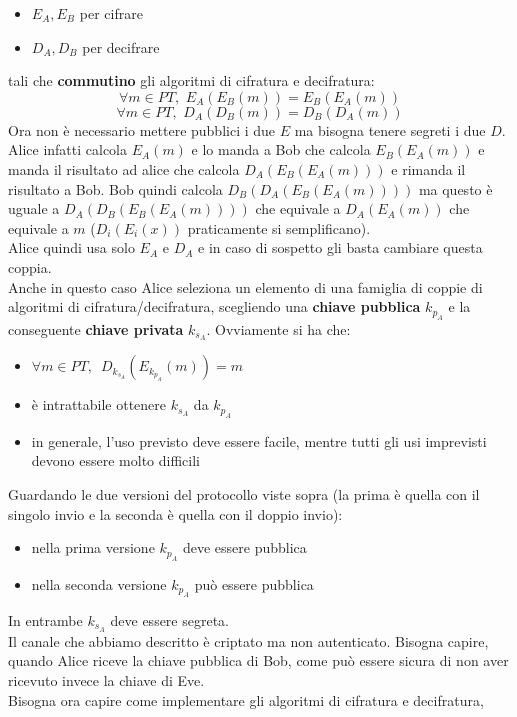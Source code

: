\documentclass[a4paper,12pt, oneside]{book}
\begin{document}
\begin{itemize}
  \item $E_A,E_B$ per cifrare
  \item $D_A,D_B$ per decifrare
\end{itemize}
tali che \textbf{commutino} gli algoritmi di cifratura e decifratura:
\[\forall m\in PT,\,\,E_A(E_B(m))=E_B(E_A(m))\]
\[\forall m\in PT,\,\,D_A(D_B(m))=D_B(D_A(m))\]
Ora non è necessario mettere pubblici i due $E$ ma bisogna tenere 
segreti i due $D$.\\
Alice infatti calcola $E_A(m)$ e lo manda a Bob che calcola $E_B(E_A(m))$ e
manda il risultato ad alice che calcola $D_A(E_B(E_A(m)))$ e rimanda il
risultato a Bob. Bob quindi calcola $D_B(D_A(E_B(E_A(m))))$ ma questo è uguale a
$D_A(D_B(E_B(E_A(m))))$ che equivale a $D_A(E_A(m))$ che equivale a $m$
($D_i(E_i(x))$ praticamente si semplificano).\\
Alice quindi usa solo $E_A$ e $D_A$ e in caso di sospetto gli basta cambiare
questa coppia.\\
Anche in questo caso Alice seleziona un elemento di una famiglia di coppie di
algoritmi di cifratura/decifratura, scegliendo una \textbf{chiave pubblica}
$k_{p_A}$ e la conseguente \textbf{chiave privata} $k_{s_A}$. Ovviamente si ha
che:
\begin{itemize}
  \item $\forall m\in PT,\,\,\,D_{k_{s_A}}(E_{k_{p_A}}(m))=m$
  \item è intrattabile ottenere $k_{s_A}$ da $k_{p_A}$
  \item in generale, l'uso previsto deve essere facile, mentre tutti gli usi
  imprevisti devono essere molto difficili  
\end{itemize}
Guardando le due versioni del protocollo viste sopra (la prima è quella con il
singolo invio e la seconda è quella con il doppio invio):
\begin{itemize}
  \item nella prima versione $k_{p_A}$ deve essere pubblica
  \item nella seconda versione $k_{p_A}$ può essere pubblica
\end{itemize}
In entrambe $k_{s_A}$ deve essere segreta.\\
Il canale che abbiamo descritto è criptato ma non autenticato. Bisogna capire,
quando Alice riceve la chiave pubblica di Bob, come può essere sicura di non
aver ricevuto invece la chiave di Eve.\\
Bisogna ora capire come implementare gli algoritmi di cifratura e decifratura,
\end{document}

